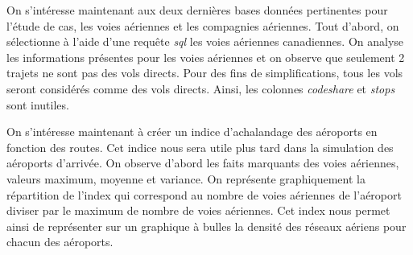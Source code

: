 \documentclass{report}
\begin{document}
On s'intéresse maintenant aux deux dernières bases données pertinentes pour l'étude de cas, les voies aériennes et les compagnies aériennes. Tout d'abord, on sélectionne à l'aide d'une requête \textit{sql} les voies aériennes canadiennes. On analyse les informations présentes pour les voies aériennes et on observe que seulement 2 trajets ne sont pas des vols directs. Pour des fins de simplifications, tous les vols seront considérés comme des vols directs. Ainsi, les colonnes \textit{codeshare} et \textit{stops} sont inutiles.

On s'intéresse maintenant à créer un indice d'achalandage des aéroports en fonction des routes. Cet indice nous sera utile plus tard dans la simulation des aéroports d'arrivée. On observe d'abord les faits marquants des voies aériennes, valeurs maximum, moyenne et variance. On représente graphiquement la répartition de l'index qui correspond au nombre de voies aériennes de l'aéroport diviser par le maximum de nombre de voies aériennes. Cet index nous permet ainsi de représenter sur un graphique à bulles  la densité des réseaux aériens pour chacun des aéroports.
\end{document}
